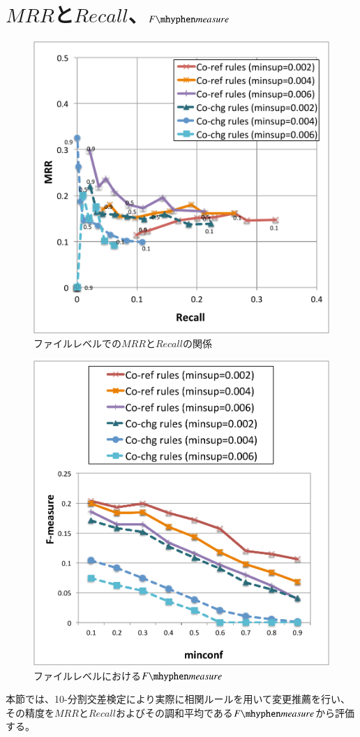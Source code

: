 \documentclass[a4paper]{jsbook}
\newcommand{\fmeasure}{F\mhyphen measure}
\begin{document}
\section{$MRR$と$Recall$、$\fmeasure$}
\begin{figure}[p]
  \centering
  \includegraphics[width = 0.95\linewidth]{resource/mrgraph_f.pdf}
  \caption{ファイルレベルでの$MRR$と$Recall$の関係}
  \label{f_mrgraph}
\end{figure}
\begin{figure}[p]
  \centering
  \includegraphics[width = 0.95\linewidth]{resource/fmeasure_f.pdf}
  \caption{ファイルレベルにおける$\fmeasure$}
  \label{f_fmeasure}
\end{figure}
本節では、10-分割交差検定により実際に相関ルールを用いて変更推薦を行い、その精度を$MRR$と$Recall$およびその調和平均である$\fmeasure$から評価する。
\end{document}
